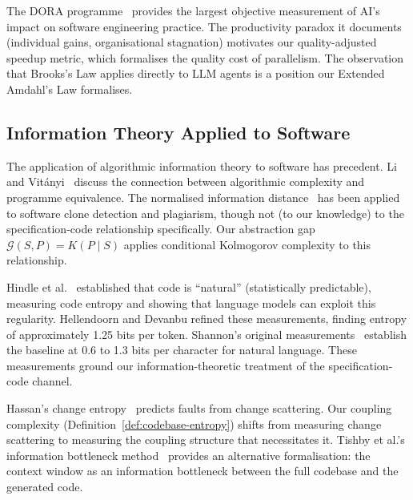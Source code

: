 \documentclass[11pt, a4paper]{googledeepmind}
\begin{document}
The DORA programme~\citep{dora2025} provides the largest objective measurement of AI's impact on software engineering practice. The productivity paradox it documents (individual gains, organisational stagnation) motivates our quality-adjusted speedup metric, which formalises the quality cost of parallelism. The observation that Brooks's Law applies directly to LLM agents is a position our Extended Amdahl's Law formalises.


\subsection{Information Theory Applied to Software}

The application of algorithmic information theory to software has precedent. Li and Vit\'{a}nyi~\citep{li2019introduction} discuss the connection between algorithmic complexity and programme equivalence. The normalised information distance~\citep{li2004similarity} has been applied to software clone detection and plagiarism, though not (to our knowledge) to the specification-code relationship specifically. Our abstraction gap $\mathcal{G}(S, P) = K(P \mid S)$ applies conditional Kolmogorov complexity to this relationship.

Hindle et al.~\citep{hindle2012naturalness} established that code is ``natural'' (statistically predictable), measuring code entropy and showing that language models can exploit this regularity. Hellendoorn and Devanbu refined these measurements, finding entropy of approximately 1.25 bits per token. Shannon's original measurements~\citep{shannon1948} establish the baseline at 0.6 to 1.3 bits per character for natural language. These measurements ground our information-theoretic treatment of the specification-code channel.

Hassan's change entropy~\citep{hassan2009} predicts faults from change scattering. Our coupling complexity (Definition~\ref{def:codebase-entropy}) shifts from measuring change scattering to measuring the coupling structure that necessitates it. Tishby et al.'s information bottleneck method~\citep{tishby2000information} provides an alternative formalisation: the context window as an information bottleneck between the full codebase and the generated code.
\end{document}
